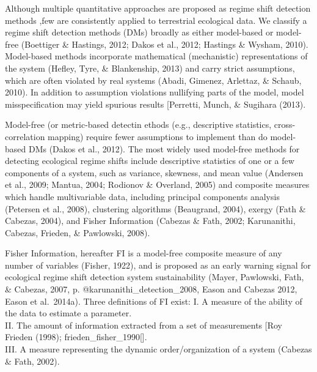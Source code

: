\documentclass[12pt,twoside]{reedthesis}
\begin{document}
Although multiple quantitative approaches are proposed as regime shift detection methods ,few are consistently applied to terrestrial ecological data. We classify a regime shift detection methods (DMs) broadly as either model-based or model-free (Boettiger \& Hastings, 2012; Dakos et al., 2012; Hastings \& Wysham, 2010). Model-based methods incorporate mathematical (mechanistic) representations of the system (Hefley, Tyre, \& Blankenship, 2013) and carry strict assumptions, which are often violated by real systems (Abadi, Gimenez, Arlettaz, \& Schaub, 2010). In addition to assumption violations nullifying parts of the model, model misspecification may yield spurious results {[}Perretti, Munch, \& Sugihara (2013).

Model-free (or metric-based detectin ethods (e.g., descriptive statistics, cross-correlation mapping) require fewer assumptions to implement than do model-based DMs (Dakos et al., 2012). The most widely used model-free methods for detecting ecological regime shifts include descriptive statistics of one or a few components of a system, such as variance, skewness, and mean value (Andersen et al., 2009; Mantua, 2004; Rodionov \& Overland, 2005) and composite measures which handle multivariable data, including principal components analysis (Petersen et al., 2008), clustering algorithms (Beaugrand, 2004), exergy (Fath \& Cabezas, 2004), and Fisher Information (Cabezas \& Fath, 2002; Karunanithi, Cabezas, Frieden, \& Pawlowski, 2008).

Fisher Information, hereafter FI is a model-free composite measure of any number of variables (Fisher, 1922), and is proposed as an early warning signal for ecological regime shift detection system sustainability (Mayer, Pawlowski, Fath, \& Cabezas, 2007, p. @karunanithi\_detection\_2008, Eason and Cabezas 2012, Eason et al.~2014a). Three definitions of FI exist:
I. A measure of the ability of the data to estimate a parameter.\\
II. The amount of information extracted from a set of measurements {[}Roy Frieden (1998); frieden\_fisher\_1990{[}{]}.\\
III. A measure representing the dynamic order/organization of a system (Cabezas \& Fath, 2002).
\end{document}
